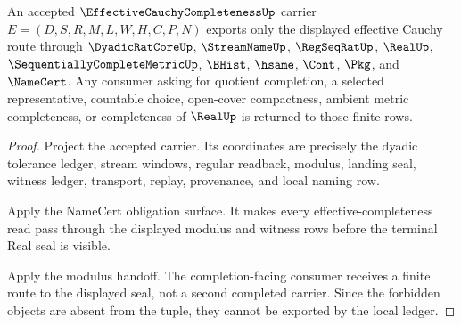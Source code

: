 \begin{theorem}
\label{thm:effective-cauchy-completeness-ledger-nonescape}
An accepted $\EffectiveCauchyCompletenessUp$ carrier $E=(D,S,R,M,L,W,H,C,P,N)$ exports only the displayed effective Cauchy route through $\DyadicRatCoreUp$, $\StreamNameUp$, $\RegSeqRatUp$, $\RealUp$, $\SequentiallyCompleteMetricUp$, $\BHist$, $\hsame$, $\Cont$, $\Pkg$, and $\NameCert$. Any consumer asking for quotient completion, a selected representative, countable choice, open-cover compactness, ambient metric completeness, or completeness of $\RealUp$ is returned to those finite rows.
\end{theorem}
\begin{proof}
Project the accepted carrier. Its coordinates are precisely the dyadic tolerance ledger, stream windows, regular readback, modulus, landing seal, witness ledger, transport, replay, provenance, and local naming row.

Apply the NameCert obligation surface. It makes every effective-completeness read pass through the displayed modulus and witness rows before the terminal Real seal is visible.

Apply the modulus handoff. The completion-facing consumer receives a finite route to the displayed seal, not a second completed carrier. Since the forbidden objects are absent from the tuple, they cannot be exported by the local ledger.
\end{proof}



